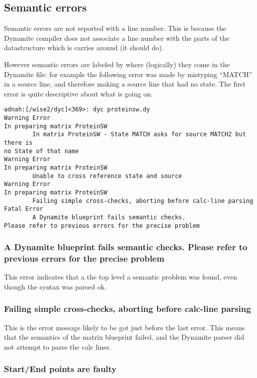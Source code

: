 \subsection{Semantic errors}

Semantic errors are not reported with a line number. This is because
the Dynamite compiler does not associate a line number with the parts
of the datastructure which is carries around (it should do).

However semantic errors are labeled by where (logically) they come in the
Dynamite file: for example the following error was made by mistyping ``MATCH'' in
a source line, and therefore making a source line that had no state. The first
error is quite descriptive about what is going on.

\begin{verbatim}
adnah:[/wise2/dyc]<369>: dyc proteinsw.dy
Warning Error
In preparing matrix ProteinSW
        In matrix ProteinSW - State MATCH asks for source MATCH2 but there is
no State of that name
Warning Error
In preparing matrix ProteinSW
        Unable to cross reference state and source
Warning Error
In preparing matrix ProteinSW
        Failing simple cross-checks, aborting before calc-line parsing
Fatal Error
        A Dynamite blueprint fails semantic checks. 
Please refer to previous errors for the precise problem
\end{verbatim}

\subsubsection{A Dynamite blueprint fails semantic checks. Please refer to previous errors for the precise problem}

This error indicates that a the top level a semantic problem was found, even
though the syntax was parsed ok.

\subsubsection{Failing simple cross-checks, aborting before calc-line parsing}

This is the error message likely to be got just before the last error. This means that the
semantics of the matrix blueprint failed, and the Dynamite parser did not attempt to
parse the calc lines.

\subsubsection{Start/End points are faulty}

